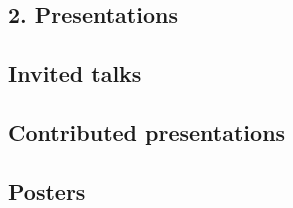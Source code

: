 \documentclass[11pt,letterpaper,sans,unicode]{moderncv}
\begin{document}
\begin{etaremune}[leftmargin=16mm]

\end{etaremune}


\subsection{2. Presentations}

\subsection{\hspace{0.2in}Invited talks} %
\renewcommand\labelenumi{\bfseries\theenumi .}

\begin{etaremune}[leftmargin=16mm]
\small

\end{etaremune}
\subsection{\hspace{0.2in}Contributed presentations} %

\renewcommand\labelenumi{\bfseries\theenumi .}
\begin{etaremune}[leftmargin=16mm]
\small

\end{etaremune}

\subsection{\hspace{0.2in}Posters}
\begin{etaremune}[leftmargin=16mm]
\small

\end{etaremune}

\end{document}
